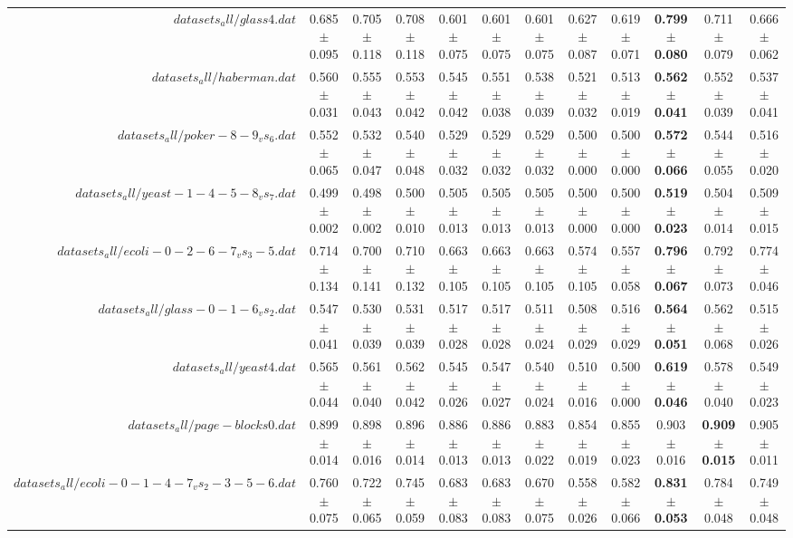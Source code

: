 \begin{table}[!ht]
{\begin{tabular}{r c c c c c c c c c c c}
$datasets_all/glass4.dat$ & 0.685 $\pm$ 0.095 & 0.705 $\pm$ 0.118 & 0.708 $\pm$ 0.118 & 0.601 $\pm$ 0.075 & 0.601 $\pm$ 0.075 & 0.601 $\pm$ 0.075 & 0.627 $\pm$ 0.087 & 0.619 $\pm$ 0.071 & \textbf{0.799 $\pm$ 0.080} & 0.711 $\pm$ 0.079 & 0.666 $\pm$ 0.062 \\
$datasets_all/haberman.dat$ & 0.560 $\pm$ 0.031 & 0.555 $\pm$ 0.043 & 0.553 $\pm$ 0.042 & 0.545 $\pm$ 0.042 & 0.551 $\pm$ 0.038 & 0.538 $\pm$ 0.039 & 0.521 $\pm$ 0.032 & 0.513 $\pm$ 0.019 & \textbf{0.562 $\pm$ 0.041} & 0.552 $\pm$ 0.039 & 0.537 $\pm$ 0.041 \\
$datasets_all/poker-8-9_vs_6.dat$ & 0.552 $\pm$ 0.065 & 0.532 $\pm$ 0.047 & 0.540 $\pm$ 0.048 & 0.529 $\pm$ 0.032 & 0.529 $\pm$ 0.032 & 0.529 $\pm$ 0.032 & 0.500 $\pm$ 0.000 & 0.500 $\pm$ 0.000 & \textbf{0.572 $\pm$ 0.066} & 0.544 $\pm$ 0.055 & 0.516 $\pm$ 0.020 \\
$datasets_all/yeast-1-4-5-8_vs_7.dat$ & 0.499 $\pm$ 0.002 & 0.498 $\pm$ 0.002 & 0.500 $\pm$ 0.010 & 0.505 $\pm$ 0.013 & 0.505 $\pm$ 0.013 & 0.505 $\pm$ 0.013 & 0.500 $\pm$ 0.000 & 0.500 $\pm$ 0.000 & \textbf{0.519 $\pm$ 0.023} & 0.504 $\pm$ 0.014 & 0.509 $\pm$ 0.015 \\
$datasets_all/ecoli-0-2-6-7_vs_3-5.dat$ & 0.714 $\pm$ 0.134 & 0.700 $\pm$ 0.141 & 0.710 $\pm$ 0.132 & 0.663 $\pm$ 0.105 & 0.663 $\pm$ 0.105 & 0.663 $\pm$ 0.105 & 0.574 $\pm$ 0.105 & 0.557 $\pm$ 0.058 & \textbf{0.796 $\pm$ 0.067} & 0.792 $\pm$ 0.073 & 0.774 $\pm$ 0.046 \\
$datasets_all/glass-0-1-6_vs_2.dat$ & 0.547 $\pm$ 0.041 & 0.530 $\pm$ 0.039 & 0.531 $\pm$ 0.039 & 0.517 $\pm$ 0.028 & 0.517 $\pm$ 0.028 & 0.511 $\pm$ 0.024 & 0.508 $\pm$ 0.029 & 0.516 $\pm$ 0.029 & \textbf{0.564 $\pm$ 0.051} & 0.562 $\pm$ 0.068 & 0.515 $\pm$ 0.026 \\
$datasets_all/yeast4.dat$ & 0.565 $\pm$ 0.044 & 0.561 $\pm$ 0.040 & 0.562 $\pm$ 0.042 & 0.545 $\pm$ 0.026 & 0.547 $\pm$ 0.027 & 0.540 $\pm$ 0.024 & 0.510 $\pm$ 0.016 & 0.500 $\pm$ 0.000 & \textbf{0.619 $\pm$ 0.046} & 0.578 $\pm$ 0.040 & 0.549 $\pm$ 0.023 \\
$datasets_all/page-blocks0.dat$ & 0.899 $\pm$ 0.014 & 0.898 $\pm$ 0.016 & 0.896 $\pm$ 0.014 & 0.886 $\pm$ 0.013 & 0.886 $\pm$ 0.013 & 0.883 $\pm$ 0.022 & 0.854 $\pm$ 0.019 & 0.855 $\pm$ 0.023 & 0.903 $\pm$ 0.016 & \textbf{0.909 $\pm$ 0.015} & 0.905 $\pm$ 0.011 \\
$datasets_all/ecoli-0-1-4-7_vs_2-3-5-6.dat$ & 0.760 $\pm$ 0.075 & 0.722 $\pm$ 0.065 & 0.745 $\pm$ 0.059 & 0.683 $\pm$ 0.083 & 0.683 $\pm$ 0.083 & 0.670 $\pm$ 0.075 & 0.558 $\pm$ 0.026 & 0.582 $\pm$ 0.066 & \textbf{0.831 $\pm$ 0.053} & 0.784 $\pm$ 0.048 & 0.749 $\pm$ 0.048 \\

\end{tabular}}
\end{table}
